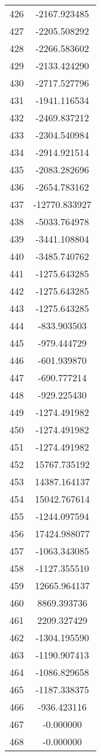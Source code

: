 \documentclass[12pt]{article}
\begin{document}
\begin{longtable}{@{}cc@{}}
426 & -2167.923485 \\
427 & -2205.508292 \\
428 & -2266.583602 \\
429 & -2133.424290 \\
430 & -2717.527796 \\
431 & -1941.116534 \\
432 & -2469.837212 \\
433 & -2304.540984 \\
434 & -2914.921514 \\
435 & -2083.282696 \\
436 & -2654.783162 \\
437 & -12770.833927 \\
438 & -5033.764978 \\
439 & -3441.108804 \\
440 & -3485.740762 \\
441 & -1275.643285 \\
442 & -1275.643285 \\
443 & -1275.643285 \\
444 & -833.903503 \\
445 & -979.444729 \\
446 & -601.939870 \\
447 & -690.777214 \\
448 & -929.225430 \\
449 & -1274.491982 \\
450 & -1274.491982 \\
451 & -1274.491982 \\
452 & 15767.735192 \\
453 & 14387.164137 \\
454 & 15042.767614 \\
455 & -1244.097594 \\
456 & 17424.988077 \\
457 & -1063.343085 \\
458 & -1127.355510 \\
459 & 12665.964137 \\
460 & 8869.393736 \\
461 & 2209.327429 \\
462 & -1304.195590 \\
463 & -1190.907413 \\
464 & -1086.829658 \\
465 & -1187.338375 \\
466 & -936.423116 \\
467 & -0.000000 \\
468 & -0.000000 \\

\end{longtable}
\end{document}
